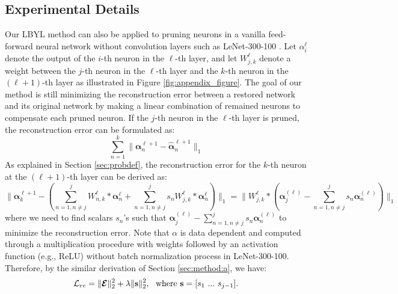 \subsection{Experimental Details} \label{sec:appendix:exp}
Our LBYL method can also be applied to pruning neurons in a vanilla feed-forward neural network without convolution layers such as LeNet-300-100 \cite{LeNet}. Let $\alpha_{i}^{\ell}$ denote the output of the $i$-th neuron in the $\ell$-th layer, and let $W^{\ell}_{j,k}$ denote a weight between the $j$-th neuron in the $\ell$-th layer and the $k$-th neuron in the $(\ell+1)$-th layer as illustrated in Figure \ref{fig:appendix_figure}. The goal of our method is still minimizing the reconstruction error between a restored network and its original network by making a linear combination of remained neurons to compensate each pruned neuron. If the $j$-th neuron in the $\ell$-th layer is pruned, the reconstruction error can be formulated as: 
\begin{equation}
\sum\limits_{n = 1}^{k}\|{{\mathbf{\alpha}}_{n}^{{\ell+1}}-{\hat{\mathbf{\alpha}}}_{n}^{{\ell+1}}}\|_1 
\nonumber
\end{equation}
As explained in Section \ref{sec:probdef}, the reconstruction error for the $k$-th neuron at the $(\ell+1)$-th layer can be derived as:
\begin{equation}
 \|{\mathbf{\alpha}}_{k}^{{\ell+1}} - (\sum\limits_{n = 1, n \neq j}^{j}{ W^{\ell}_{n,k} * \mathbf{\alpha}_{n}^{\ell}} +{\sum\limits_{n = 1, n \neq j}^{j} s_nW^{\ell}_{j,k} *  \mathbf{\alpha}_{n}^{\ell}} ) \|_1  = \|{ W_{j,k}^{\ell} * (\mathbf{\alpha}_{j}^{(\ell)} - \sum\limits_{n = 1, n \neq j}^{j}{s_{n}} \mathbf{\alpha}_{n}^{(\ell)})}\|_1
\nonumber
\end{equation}
where we need to find scalars $s_{n}$'s such that ${ \mathbf{\alpha}_{j}^{(\ell)} - \sum\limits_{n = 1, n \neq j}^{j}{s_{n}} \mathbf{\alpha}_{n}^{(\ell)}}$ to minimize the reconstruction error. Note that $\alpha$ is data dependent and computed through a multiplication procedure with weights followed by an activation function (e.g., ReLU) without batch normalization process in LeNet-300-100. Therefore, by the similar derivation of Section \ref{sec:method:a}, we have:
\begin{equation}
     \mathcal{L}_{re} =  \|\boldsymbol{\mathcal{E}}\|_2^{2} + \lambda \|\mathbf{s}\|_{2}^{2}, ~~\text{where}~\mathbf{s} =  [s_{1}~...~s_{j-1}].
    \nonumber
\end{equation}

